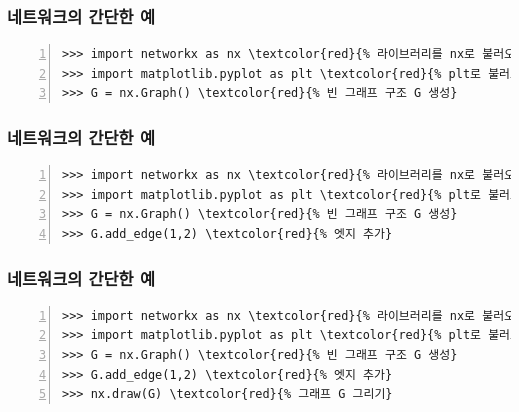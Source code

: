 \documentclass{beamer}
\begin{document}
\begin{frame}[fragile] %
\frametitle{네트워크의 간단한 예}
\begin{Verbatim}[numbers=left,commandchars=\\\{\}]
>>> import networkx as nx \textcolor{red}{% 라이브러리를 nx로 불러오기}
>>> import matplotlib.pyplot as plt \textcolor{red}{% plt로 불러오기}
>>> G = nx.Graph() \textcolor{red}{% 빈 그래프 구조 G 생성}
\end{Verbatim}
\end{frame}

\begin{frame}[fragile] %
\frametitle{네트워크의 간단한 예}
\begin{Verbatim}[numbers=left,commandchars=\\\{\}]
>>> import networkx as nx \textcolor{red}{% 라이브러리를 nx로 불러오기}
>>> import matplotlib.pyplot as plt \textcolor{red}{% plt로 불러오기}
>>> G = nx.Graph() \textcolor{red}{% 빈 그래프 구조 G 생성}
>>> G.add_edge(1,2) \textcolor{red}{% 엣지 추가}
\end{Verbatim}
\end{frame}

\begin{frame}[fragile] %
\frametitle{네트워크의 간단한 예}
\begin{Verbatim}[numbers=left,commandchars=\\\{\}]
>>> import networkx as nx \textcolor{red}{% 라이브러리를 nx로 불러오기}
>>> import matplotlib.pyplot as plt \textcolor{red}{% plt로 불러오기}
>>> G = nx.Graph() \textcolor{red}{% 빈 그래프 구조 G 생성}
>>> G.add_edge(1,2) \textcolor{red}{% 엣지 추가}
>>> nx.draw(G) \textcolor{red}{% 그래프 G 그리기}
\end{Verbatim}
\end{frame}
\end{document}

